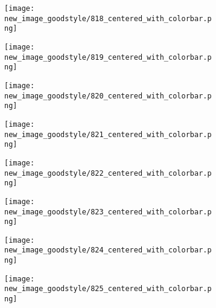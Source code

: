\documentclass[a4paper,12pt]{article}
\begin{document}
\begin{figure}[H]
  \begin{subfigure}{0.11\textwidth}
    \texttt{[image: new\_image\_goodstyle/818\_centered\_with\_colorbar.png]}
  \end{subfigure}
  \hfill
  \begin{subfigure}{0.11\textwidth}
    \texttt{[image: new\_image\_goodstyle/819\_centered\_with\_colorbar.png]}
  \end{subfigure}
  \hfill
  \begin{subfigure}{0.11\textwidth}
    \texttt{[image: new\_image\_goodstyle/820\_centered\_with\_colorbar.png]}
  \end{subfigure}
  \hfill
  \begin{subfigure}{0.11\textwidth}
    \texttt{[image: new\_image\_goodstyle/821\_centered\_with\_colorbar.png]}
  \end{subfigure}
  \hfill
  \begin{subfigure}{0.11\textwidth}
    \texttt{[image: new\_image\_goodstyle/822\_centered\_with\_colorbar.png]}
  \end{subfigure}
  \hfill
  \begin{subfigure}{0.11\textwidth}
    \texttt{[image: new\_image\_goodstyle/823\_centered\_with\_colorbar.png]}
  \end{subfigure}
  \hfill
  \begin{subfigure}{0.11\textwidth}
    \texttt{[image: new\_image\_goodstyle/824\_centered\_with\_colorbar.png]}
  \end{subfigure}
  \hfill
  \begin{subfigure}{0.11\textwidth}
    \texttt{[image: new\_image\_goodstyle/825\_centered\_with\_colorbar.png]}
  \end{subfigure}
  \hfill
\end{figure}
\end{document}
